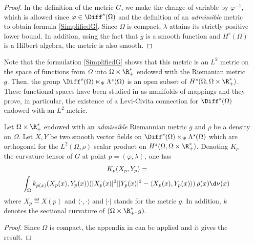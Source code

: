 \begin{proof}
In the definition of the metric $G$, we make the change of variable by $\varphi^{-1}$, which is allowed since $\varphi \in \Diff^{s}(\Omega)$ and the definition of an \textit{admissible} metric to obtain formula \eqref{SimplifiedG}.
Since $\Omega$ is compact, $\lambda$ attains its strictly positive lower bound. In addition, using the fact that $g$ is a smooth function and $H^s(\Omega)$ is a Hilbert algebra, the metric is also smooth.
\end{proof}



Note that the formulation \eqref{SimplifiedG} shows that this metric is an $L^2$ metric on the space of functions from $\Omega$ into $\Omega \times \R_+^*$ endowed with the Riemanian metric $g$. Then, the group $\Diff^{s}(\Omega) \ltimes_\Psi \Lambda^s(\Omega)$ is an open subset of $H^s(\Omega, \Omega \times \R_+^*)$.
These functional spaces have been studied in \cite{em70} as manifolds of mappings and they prove, in particular, the existence of a Levi-Civita connection for $\Diff^{s}(\Omega)$ endowed with an $L^2$ metric.

\begin{theorem}\label{SectionalCurvature}
Let $\Omega \times \R_+^*$ endowed with an \textit{admissible} Riemannian metric $g$ and $\rho$ be a density on $\Omega$. Let $X,Y$ be two smooth vector fields on $\Diff^{s}(\Omega) \ltimes_\Psi \Lambda^s(\Omega)$ which are orthogonal for the $L^2(\Omega,\rho)$ scalar product on $H^s(\Omega, \Omega \times \R_+^*)$. Denoting $K_{p}$ the curvature tensor of $G$ at point $p=(\varphi,\lambda)$, one has
\begin{multline}\label{eq:SectionalCurvature}
K_{p}(X_p,Y_p) = \\ \int_\Omega k_{p(x)}(X_p(x),Y_p(x)) (|X_p(x)|^2| |Y_p(x)|^2 - \langle X_p(x) , Y_p(x) \rangle) \, \rho(x) \d \nu(x) \,
\end{multline}
where  $X_p \eqdef X(p)$ and $\langle \cdot , \cdot \rangle $ and $| \cdot |$ stands for the metric $g$. In addition, $k$ denotes the sectional curvature of $(\Omega \times \R_+^*,g)$.
\end{theorem}

\begin{proof}
Since $\Omega$ is compact, the appendix in \cite{freed1989} can be applied and it gives the result.
\end{proof}

